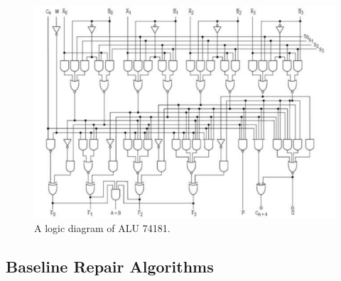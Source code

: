 \documentclass[review]{elsarticle}
\begin{document}

\begin{figure}{}%
\begin{center}
  \includegraphics[width=0.9\columnwidth]{74181.pdf}
  \caption{A logic diagram of ALU 74181.}
  \label{fig:74181}
\end{center}
\end{figure}


\subsection{Baseline Repair Algorithms}
\end{document}
